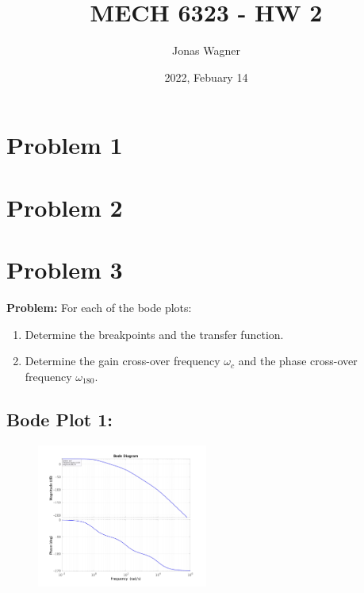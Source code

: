 \documentclass[letter]{article}
\title{MECH 6323 - HW 2}
\author{Jonas Wagner}
\date{2022, Febuary 14}
\numberwithin{equation}{section}
\begin{document}
	

\maketitle

\tableofcontents

\newpage
\section{Problem 1}




\newpage
\section{Problem 2}




\newpage
\section{Problem 3}
\textbf{Problem:}
For each of the bode plots:
\begin{enumerate}
	\item Determine the breakpoints and the transfer function.
	\item Determine the gain cross-over frequency $\omega_c$ and the phase cross-over frequency $\omega_{180}$.
\end{enumerate}

\subsection{Bode Plot 1:}
\begin{figure}[ht]
	\centering
	\includegraphics[width=0.5\textwidth]{figs/pblm3a.jpg}
\end{figure}
\end{document}
